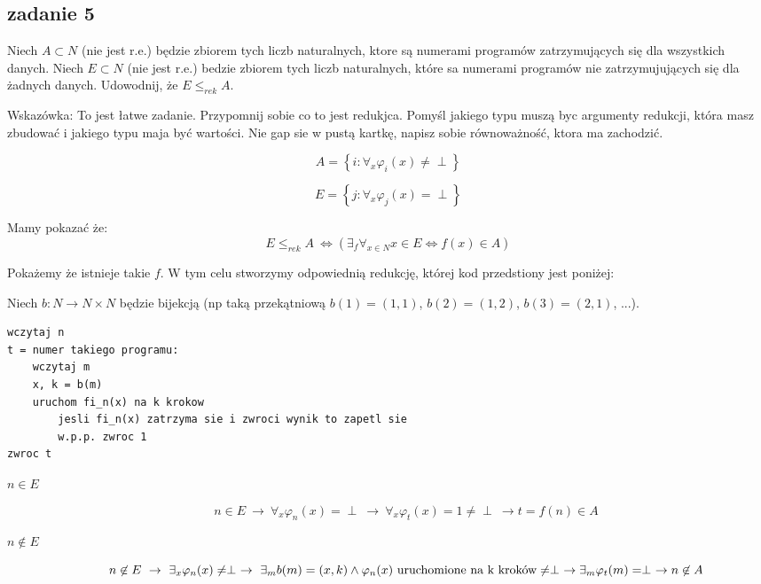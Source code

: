 \documentclass[svgnames]{report}
\begin{document}

\subsection{zadanie 5}
\begin{framed}
Niech $A \subset N$ (nie jest r.e.) będzie zbiorem tych liczb naturalnych, ktore są numerami programów zatrzymujących się dla wszystkich danych. Niech $E \subset N$ (nie jest r.e.) bedzie zbiorem tych liczb naturalnych, które sa numerami programów nie zatrzymujujących się dla żadnych danych. Udowodnij, że $E \leqslant_{rek} A$.

Wskazówka: To jest łatwe zadanie. Przypomnij sobie co to jest redukjca. Pomyśl jakiego typu muszą byc argumenty redukcji, która masz zbudować i jakiego typu maja być wartości. Nie gap sie w pustą kartkę, napisz sobie równoważność, ktora ma zachodzić.
\end{framed}


\begin{equation}
A = \left\{i : \forall_x \varphi_i(x) \not= \perp \right\}
\end{equation}

\begin{equation}
E = \left\{j : \forall_x \varphi_j(x) = \perp \right\}
\end{equation}

Mamy pokazać że:
\begin{equation}
E \leqslant_{rek} A \ \Leftrightarrow (\exists_f \forall_{x \in N} x \in E \Leftrightarrow f(x) \in A)
\end{equation}

Pokażemy że istnieje takie $f$.
W tym celu stworzymy odpowiednią redukcję, której kod przedstiony jest poniżej:

Niech $b:N \rightarrow N \times N$ będzie bijekcją (np taką przekątniową $b(1) = (1,1)$, $b(2) = (1,2)$, $b(3) = (2,1)$, ...).

\begin{lstlisting}
wczytaj n
t = numer takiego programu:
	wczytaj m
	x, k = b(m)
	uruchom fi_n(x) na k krokow
		jesli fi_n(x) zatrzyma sie i zwroci wynik to zapetl sie
		w.p.p. zwroc 1
zwroc t
\end{lstlisting}

\begin{description}
	\item[$n \in E$] 
		\begin{equation*}
			n \in E \ \rightarrow \ \forall_x \varphi_n(x) = \perp \ \rightarrow \ \forall_x \varphi_t(x) = 1 \not= \perp \ \rightarrow t = f(n) \in A
		\end{equation*}
	\item[$n \not\in E$]
		\begin{equation*}
			n \not\in E \ \rightarrow \ \exists_x \varphi_n(x) \not= \perp \ \rightarrow \ \exists_m b(m)=(x,k) \wedge \varphi_n(x) \hbox{ uruchomione na k kroków} \not= \perp \ \rightarrow \exists_m \varphi_t(m) = \perp \ \rightarrow n \not\in A
		\end{equation*}
		
\end{description}
\end{document}
